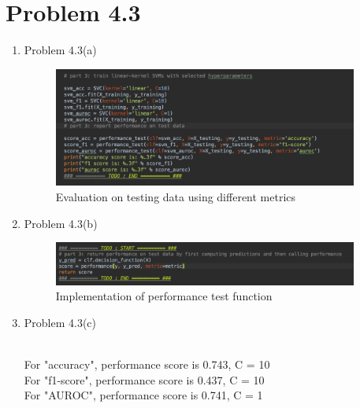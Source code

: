 \documentclass[11pt]{article}
\newcommand{\solution}[1]{{{\color{black}{\bf Solution:} {#1}}}}
\begin{document}
\begin{enumerate}
\end{enumerate}

\vspace{5cm}

\newpage

\section{Problem 4.3}

\begin{enumerate}

\item Problem 4.3(a)

\solution{


	\begin{figure}[h!]
	\centering
	\includegraphics[width = 10cm]{43a}
	\caption{Evaluation on testing data using different metrics}
	\end{figure}

}

\item Problem 4.3(b)

\solution{
	
	\begin{figure}[h!]
	\centering
	\includegraphics[width = 10cm]{43b}
	\caption{Implementation of performance test function}
	\end{figure}
	
	}
	
	
\item Problem 4.3(c)

\solution{\\
	For "accuracy", performance score is 0.743, C = 10\\
	For "f1-score", performance score is 0.437, C = 10\\
	For "AUROC", performance score is 0.741, C = 1
}

\end{enumerate}
\end{document}
